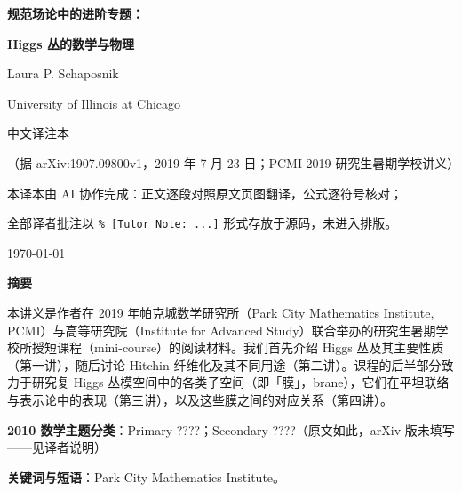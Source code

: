 
\begin{titlepage}
\centering
\vspace*{2.5cm}
{\LARGE\bfseries 规范场论中的进阶专题：\par}
\vspace{0.3cm}
{\LARGE\bfseries Higgs 丛的数学与物理\par}
\vspace{1.6cm}
{\large Laura P. Schaposnik\par}
\vspace{0.4cm}
{\normalsize University of Illinois at Chicago\par}
\vspace{2.2cm}
{\large 中文译注本\par}
\vspace{0.3cm}
{\normalsize（据 arXiv:1907.09800v1，2019 年 7 月 23 日；PCMI 2019 研究生暑期学校讲义）\par}
\vfill
{\small 本译本由 AI 协作完成：正文逐段对照原文页图翻译，公式逐符号核对；\par}
{\small 全部译者批注以 \texttt{\% [Tutor Note: ...]} 形式存放于源码，未进入排版。\par}
\vspace{0.8cm}
{\small \today\par}
\end{titlepage}

\thispagestyle{plain}
\begin{center}
{\large\bfseries 摘要}
\end{center}

\noindent
本讲义是作者在 2019 年帕克城数学研究所（Park City Mathematics Institute, PCMI）与高等研究院（Institute for Advanced Study）联合举办的研究生暑期学校所授短课程（mini-course）的阅读材料。我们首先介绍 Higgs 丛及其主要性质（第一讲），随后讨论 Hitchin 纤维化及其不同用途（第二讲）。课程的后半部分致力于研究复 Higgs 丛模空间中的各类子空间（即「膜」，brane），它们在平坦联络与表示论中的表现（第三讲），以及这些膜之间的对应关系（第四讲）。

\vspace{0.4cm}
\noindent
{\small\textbf{2010 数学主题分类}：Primary ????；Secondary ????（原文如此，arXiv 版未填写——见译者说明）\par}
\noindent
{\small\textbf{关键词与短语}：Park City Mathematics Institute。\par}

